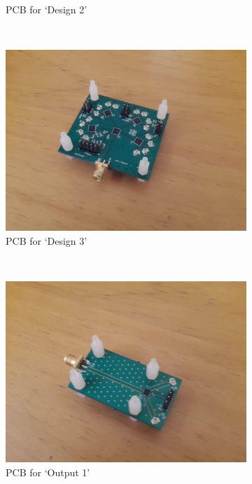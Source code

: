 \documentclass[12pt,openany,a4paper]{book}
\begin{document}
\begin{figure}[H]
\begin{subfigure}[t]{0.5\textwidth}
        \caption{PCB for `Design 2'}
    \end{subfigure}
    ~
    \begin{subfigure}[t]{0.5\textwidth}
        \centering
        \includegraphics[width=1\textwidth]{pcb-design3.jpg}
        \caption{PCB for `Design 3'}
    \end{subfigure}
    ~
    \begin{subfigure}[t]{0.5\textwidth}
        \centering
        \includegraphics[width=1\textwidth]{pcb-output1-small.jpg}
        \caption{PCB for `Output 1'}
    \end{subfigure}%
    ~ 
    \begin{subfigure}[t]{0.5\textwidth}
        \centering

\end{subfigure}
\end{figure}
\end{document}
